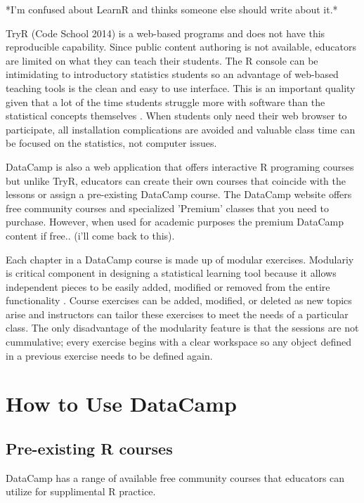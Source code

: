 \documentclass{tise_style}
\begin{document}
*I'm confused about LearnR and thinks someone else should write about it.*

TryR (Code School 2014) is a web-based programs and does not have this reproducible capability. Since public content authoring is not available, educators are limited on what they can teach their students. The R console can be intimidating to introductory statistics students so an advantage of web-based teaching tools is 
the clean and easy to use interface. This is an important quality given that a lot of the time students struggle more with 
software than the statistical concepts themselves \citep{Hare2017}. When students only need their web browser to participate,
all installation complications are avoided and valuable class time can be focused on the statistics, not computer issues.


DataCamp is also a web application that offers interactive R programing courses but unlike TryR, educators can 
create their own courses that coincide with the lessons or assign a pre-existing DataCamp course. The DataCamp website offers 
free community courses and specialized 'Premium' classes that you need to purchase. However, when used for academic purposes
the premium DataCamp content if free.. (i'll come back to this). 
 
Each chapter in a DataCamp course is made up of modular exercises. Modulariy is critical component in designing a statistical learning tool because it allows independent pieces to be easily added, modified or removed from the entire functionality \citep{Hare2017}. Course exercises can be added, modified, or deleted as new topics arise and instructors can tailor
these exercises to meet the needs of a particular class. The only disadvantage of the modularity feature is that the sessions
are not cummulative; every exercise begins with a clear workspace so any object defined in a previous exercise needs to be 
defined again.  



\section{How to Use DataCamp}

\subsection{Pre-existing R courses}
DataCamp has a range of available free community courses that educators can utilize for supplimental R practice.
\end{document}

